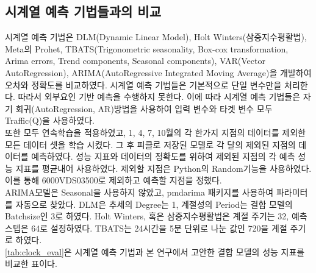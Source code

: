 \documentclass[11pt]{report}
\begin{document}
\subsection{시계열 예측 기법들과의 비교}
시계열 예측 기법은 DLM(Dynamic Linear Model), Holt Winters(삼중지수평활법), Meta의 Prohet, TBATS(Trigonometric seasonality, Box-cox transformation, Arima errors, Trend components, 
Seasonal components), VAR(Vector AutoRegression), ARIMA(AutoRegressive Integrated Moving Average)을 개발하여 오차와 정확도를 비교하였다. 
시계열 예측 기법들은 기본적으로 단일 변수만을 처리한다. 따라서 외부요인 기반 예측을 수행하지 못한다. 이에 따라 시계열 예측 기법들은 자기 회귀(AutoRegression, AR)방법을 사용하여 입력 변수와 타겟 변수 모두 Traffic(Q)을 사용하였다. \\
\indent 또한 모두 연속학습을 적용하였고, 1, 4, 7, 10월의 각 한가지 지점의 데이터를 제외한 모든 데이터 셋을 학습 시켰다. 그 후 피클로 저장된 모델로 각 달의 제외된 지점의 데이터를 예측하였다. 
성능 지표와 데이터의 정확도를 위하여 제외된 지점의 각 예측 성능 지표를 평균내어 사용하였다. 제외할 지점은 Python의 Random기능을 사용하였다. 이를 통해 6000VDS03500로 제외하고 예측할 지점을 정했다. \\
\indent ARIMA모델은 Seasonal을 사용하지 않았고, pmdarima 패키지를 사용하여 파라미터를 자동으로 찾았다. DLM은 추세의 Degree는 1, 계절성의 Period는 결합 모델의 Batchsize인 3로 하였다. 
Holt Winters, 혹은 삼중지수평활법은 계절 주기는 32, 예측 스텝은 64로 설정하였다. TBATS는 24시간을 5분 단위로 나눈 값인 720을 계절 주기로 하였다. \\
\indent \autoref{tab:clock_eval}은 시계열 예측 기법과 본 연구에서 고안한 결합 모델의 성능 지표를 비교한 표이다. 
\end{document}
